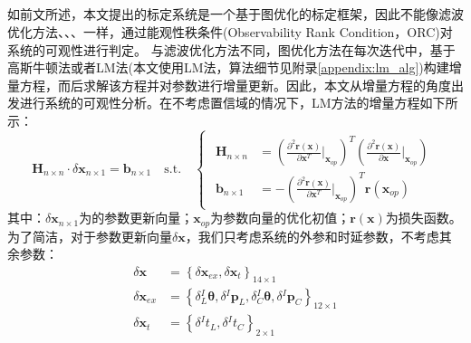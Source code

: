 \subsection{}
如前文所述，本文提出的标定系统是一个基于图优化的标定框架，因此不能像滤波优化方法\cite{huai2022observability}、\cite{mirzaei2008kalman}、\cite{yang2019degenerate}、\cite{lv2022observability}一样，通过能观性秩条件(Observability Rank Condition，ORC)对系统的可观性进行判定。
与滤波优化方法不同，图优化方法在每次迭代中，基于高斯牛顿法或者LM法(本文使用LM法，算法细节见附录\ref{appendix:lm_alg})构建增量方程，而后求解该方程并对参数进行增量更新。因此，本文从增量方程的角度出发进行系统的可观性分析。在不考虑置信域的情况下，LM方法的增量方程如下所示：
\begin{equation}
  \boldsymbol{H}_{n\times n}\cdot\delta\boldsymbol{x}_{n\times 1}=\boldsymbol{b}_{n\times 1}
  \quad
  \mathrm{s.t.}
  \quad
  \begin{cases}
    \begin{aligned}
      \boldsymbol{H}_{n\times n} & =	\left( \frac{\partial^2 \boldsymbol{r}(\boldsymbol{x})}{\partial \boldsymbol{x}^T}\bigg|_{\boldsymbol{x}_{op}}\right)^T
      \left( \frac{\partial^2 \boldsymbol{r}(\boldsymbol{x})}{\partial \boldsymbol{x}}\bigg|_{\boldsymbol{x}_{op}}\right)                                                                       \\
      \boldsymbol{b}_{n\times 1} & =-\left( \frac{\partial^2 \boldsymbol{r}(\boldsymbol{x})}{\partial \boldsymbol{x}^T}\bigg|_{\boldsymbol{x}_{op}}\right)^T\boldsymbol{r}(\boldsymbol{x}_{op})
    \end{aligned}
  \end{cases}
\end{equation}
其中：$\delta\boldsymbol{x}_{n\times1}$为的参数更新向量；$\boldsymbol{x}_{op}$为参数向量的优化初值；$\boldsymbol{r}(\boldsymbol{x})$为损失函数。
为了简洁，对于参数更新向量$\delta\boldsymbol{x}$，我们只考虑系统的外参和时延参数，不考虑其余参数：
\begin{equation}
  \begin{aligned}
    \delta\boldsymbol{x}      & =\left\lbrace
    \delta\boldsymbol{x}_{ex},\delta\boldsymbol{x}_{t}
    \right\rbrace_{14\times 1}                                                                                                                                                                                \\
    \delta\boldsymbol{x}_{ex} & =\left\lbrace \delta{^{I}_{L}\boldsymbol{\theta}},\delta{^{I}}\boldsymbol{p}_{L},\delta{^{I}_{C}\boldsymbol{\theta}},\delta{^{I}}\boldsymbol{p}_{C}\right\rbrace_{12\times 1} \\
    \delta\boldsymbol{x}_{t}  & =\left\lbrace \delta{^{I}t_{L}},\delta{^{I}t_{C}}\right\rbrace_{2\times 1}                                                                                                    \\
  \end{aligned}
\end{equation}
